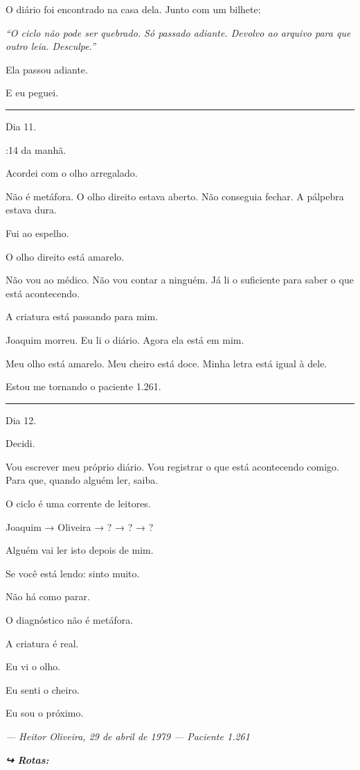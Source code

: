 \noindent O diário foi encontrado na casa dela. Junto com um bilhete:

\noindent \textit{\textquotedblleft{}O ciclo não pode ser quebrado. Só passado adiante. Devolvo ao arquivo para que outro leia. Desculpe.\textquotedblright{}}

\noindent Ela passou adiante.

\noindent E eu peguei.

\vspace{0.5em}\noindent\rule{\textwidth}{0.5pt}\vspace{0.5em}

\noindent Dia 11.

:14 da manhã.

\noindent Acordei com o olho arregalado.

\noindent Não é metáfora. O olho direito estava aberto. Não conseguia fechar. A pálpebra estava dura.

\noindent Fui ao espelho.

\noindent O olho direito está amarelo.

\noindent Não vou ao médico. Não vou contar a ninguém. Já li o suficiente para saber o que está acontecendo.

\noindent A criatura está passando para mim.

\noindent Joaquim morreu.
Eu li o diário.
Agora ela está em mim.

\noindent Meu olho está amarelo.
Meu cheiro está doce.
Minha letra está igual à dele.

\noindent Estou me tornando o paciente 1.261.

\vspace{0.5em}\noindent\rule{\textwidth}{0.5pt}\vspace{0.5em}

\noindent Dia 12.

\noindent Decidi.

\noindent Vou escrever meu próprio diário. Vou registrar o que está acontecendo comigo. Para que, quando alguém ler, saiba.

\noindent O ciclo é uma corrente de leitores.

\noindent Joaquim → Oliveira → ? → ? → ?

\noindent Alguém vai ler isto depois de mim.

\noindent Se você está lendo: sinto muito.

\noindent Não há como parar.

\noindent O diagnóstico não é metáfora.

\noindent A criatura é real.

\noindent Eu vi o olho.

\noindent Eu senti o cheiro.

\noindent Eu sou o próximo.

\noindent \textit{--- Heitor Oliveira, 29 de abril de 1979}
\textit{--- Paciente 1.261}

\vspace{0.5em}
\noindent\textit{\textbf{↪ Rotas:}  \rotasep {}}